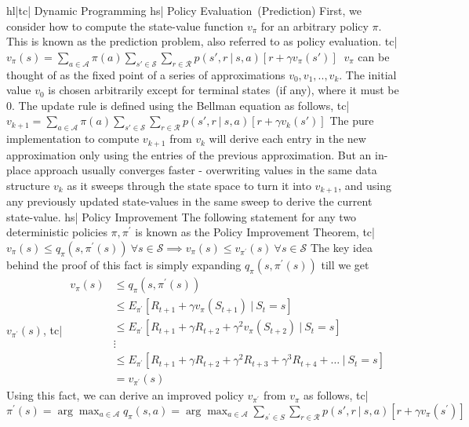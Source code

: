 hl|tc| Dynamic Programming
hs| Policy Evaluation (Prediction)
First, we consider how to compute the state-value function \( v_\pi \) for an arbitrary policy \( \pi \). This is known as the prediction problem, also referred to as policy evaluation.
tc| \( v_\pi(s) = \sum_{a \in \mathcal{A}} \pi(a) \sum_{s' \in \mathcal{S}} \sum_{r \in \mathcal{R}} p(s', r \ | \ s, a) [r + \gamma v_\pi(s')] \ \)
\( v_\pi \) can be thought of as the fixed point of a series of approximations \( v_0, v_1, .., v_k \). The initial value \( v_0 \) is chosen arbitrarily except for terminal states (if any), where it must be \( 0 \). The update rule is defined using the Bellman equation as follows,
tc| \( v_{k+1} = \sum_{a \in \mathcal{A}} \pi(a) \sum_{s' \in \mathcal{S}} \sum_{r \in \mathcal{R}} p(s', r \ | \ s, a) [r + \gamma v_k(s')] \)
The pure implementation to compute \( v_{k+1} \) from \( v_k \) will derive each entry in the new approximation only using the entries of the previous approximation. But an in-place approach usually converges faster - overwriting values in the same data structure \( v_k \) as it sweeps through the state space to turn it into \( v_{k+1} \), and using any previously updated state-values in the same sweep to derive the current state-value.
hs| Policy Improvement
The following statement for any two deterministic policies \( \pi, \pi^\prime \) is known as the Policy Improvement Theorem,
tc| \( v_\pi(s) \le q_\pi(s, \pi^\prime(s)) \ \forall s \in \mathcal{S} \implies v_\pi(s) \le v_{\pi^\prime}(s) \ \forall s \in \mathcal{S} \)
The key idea behind the proof of this fact is simply expanding \( q_\pi(s, \pi^\prime(s)) \) till we get \( v_{\pi^\prime}(s) \),
tc| \(\begin{aligned} v_\pi(s) &\le q_\pi(s, \pi^\prime(s)) \\ &\le E_{\pi^\prime}[R_{t+1} + \gamma v_\pi(S_{t+1}) \ | \ S_t = s] \\ &\le E_{\pi^\prime}[R_{t+1} + \gamma R_{t+2} + \gamma^2 v_\pi(S_{t+2}) \ | \ S_t = s] \\ &\vdots \\ &\le E_{\pi^\prime}[R_{t+1} + \gamma R_{t+2} + \gamma^2 R_{t+3} + \gamma^3 R_{t+4} + \ldots \ | \ S_t = s] \\ &= v_{\pi^\prime}(s) \end{aligned}\)
Using this fact, we can derive an improved policy \( v_{\pi^\prime} \) from \( v_\pi \) as follows,
tc| \( \pi^\prime(s) = \arg\max_{a \in \mathcal{A}} q_\pi (s, a) = \arg\max_{a \in \mathcal{A}} \sum_{s^\prime \in S} \sum_{r \in \mathcal{R}} p(s', r \ | \ s, a) [r + \gamma v_\pi(s^\prime)] \)
